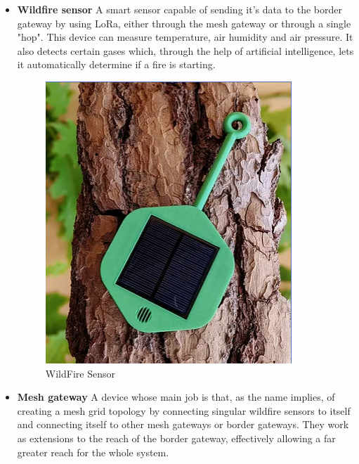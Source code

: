 \documentclass[11pt]{article}
\begin{document}
\begin{itemize}
    \item {\textbf{Wildfire sensor}} A smart sensor capable of sending it's data to the border gateway by using LoRa, either through the mesh gateway or through a single "hop". This device can measure temperature, air humidity and air pressure. It also detects certain gases which, through the help of artificial intelligence, lets it automatically determine if a fire is starting. \par
    \vspace{0.5 cm}
    \begin{figure}[ht]
        \centering
        \includegraphics[scale = 0.4]{WildFire Sensor.png}
        \caption{WildFire Sensor}
        \label{fig:WildfireSensor}
    \end{figure}
    \item {\textbf{Mesh gateway}} A device whose main job is that, as the name implies, of creating a mesh grid topology by connecting singular wildfire sensors to itself and connecting itself to other mesh gateways or border gateways.
    They work as extensions to the reach of the border gateway, effectively allowing a far greater reach for the whole system. \par
    \vspace{0.5 cm}
    \begin{figure}[ht]
        \centering

\end{figure}
\end{itemize}
\end{document}
